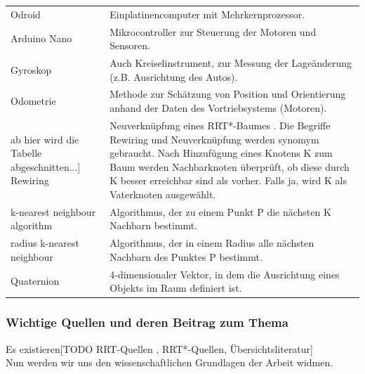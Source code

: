\begin{tabularx}{\textwidth}{l|X}
Odroid & Einplatinencomputer mit Mehrkernprozessor. \\
Arduino Nano & Mikrocontroller zur Steuerung der Motoren und Sensoren.\\
Gyroskop & Auch Kreiselinstrument, zur Messung der Lageänderung (z.B. Ausrichtung des Autos).\\
Odometrie & Methode zur Schätzung von Position und Orientierung anhand der Daten des Vortriebsystems (Motoren).\\
[TODO] ab hier wird die Tabelle abgeschnitten...]
Rewiring & Neuverknüpfung eines RRT*-Baumes \citep{KaFra10}. Die Begriffe Rewiring und Neuverknüpfung werden synomym gebraucht. Nach Hinzufügung eines Knotens K zum Baum werden Nachbarknoten überprüft, ob diese durch K besser erreichbar sind als vorher. Falls ja, wird K als Vaterknoten ausgewählt. \\
k-nearest neighbour algorithm& Algorithmus, der zu einem Punkt P die nächsten K Nachbarn bestimmt.\\
radius k-nearest neighbour & Algorithmus, der in einem Radius alle nächsten Nachbarn des Punktes P bestimmt.\\
Quaternion & 4-dimensionaler Vektor, in dem die Ausrichtung eines Objekts im Raum definiert ist.\\


\end{tabularx} 

\subsubsection{Wichtige Quellen und deren Beitrag zum Thema}
Es existieren[TODO RRT-Quellen \citep[vgl][]{Lav98}, RRT*-Quellen, Übersichtsliteratur]
\\
Nun werden wir uns den wissenschaftlichen Grundlagen der Arbeit widmen.

